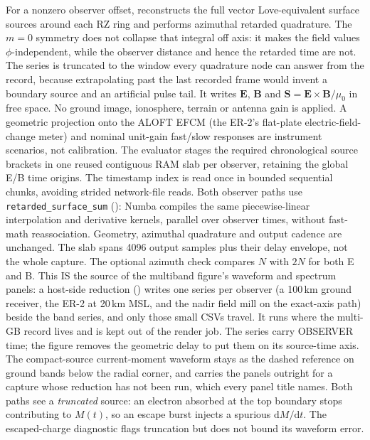 \documentclass[11pt]{article}
\DeclareRobustCommand{\code}[1]{\ifmmode\text{\ttfamily#1}\else\nolinkurl{#1}\fi}
\begin{document}
For a nonzero observer offset,  reconstructs the
full vector Love-equivalent surface sources around each RZ ring and performs
azimuthal retarded quadrature. The $m=0$ symmetry does not collapse that
integral off axis: it makes the field values $\phi$-independent, while the
observer distance and hence the retarded time are not. The series is
truncated to the window every quadrature node can answer from the record,
because extrapolating past the last recorded frame would invent a boundary
source and an artificial pulse tail. It writes $\mathbf E$, $\mathbf B$ and
$\mathbf S=\mathbf E\times\mathbf B/\mu_0$ in free space. No ground image,
ionosphere, terrain or antenna gain is applied. A geometric projection onto
the ALOFT EFCM (the ER-2's flat-plate electric-field-change meter) and
nominal unit-gain fast/slow responses are instrument scenarios, not calibration.
The evaluator stages the required chronological source brackets in one reused
contiguous RAM slab per observer, retaining the global E/B time origins.
The timestamp index is read once in bounded sequential chunks, avoiding
strided network-file reads. Both observer paths use
\code{retarded\_surface\_sum} ():
Numba compiles the same piecewise-linear interpolation and derivative kernels,
parallel over observer times, without fast-math reassociation. Geometry,
azimuthal quadrature and output cadence are unchanged.
The slab spans 4096 output samples plus their delay envelope, not the whole
capture. The optional azimuth check compares $N$ with $2N$ for both E and B.
This IS the source of the multiband figure's waveform and spectrum panels: a
host-side reduction ()
writes one series per observer (a 100\,km ground receiver, the ER-2 at
20\,km MSL, and the nadir field mill on the exact-axis path) beside the band
series, and only those small CSVs travel. It runs where the multi-GB record
lives and is kept out of the render job.
The series carry OBSERVER time; the figure removes the geometric delay to put
them on its source-time axis. The compact-source current-moment waveform stays
as the dashed reference on ground bands below the radial corner, and carries the panels outright
for a capture whose reduction has not been run, which every panel title names.
Both paths see a \emph{truncated} source: an electron absorbed at the top
boundary stops contributing to $M(t)$, so an escape burst injects a spurious
$\mathrm{d}M/\mathrm{d}t$. The escaped-charge diagnostic flags truncation but
does not bound its waveform error.
\end{document}
